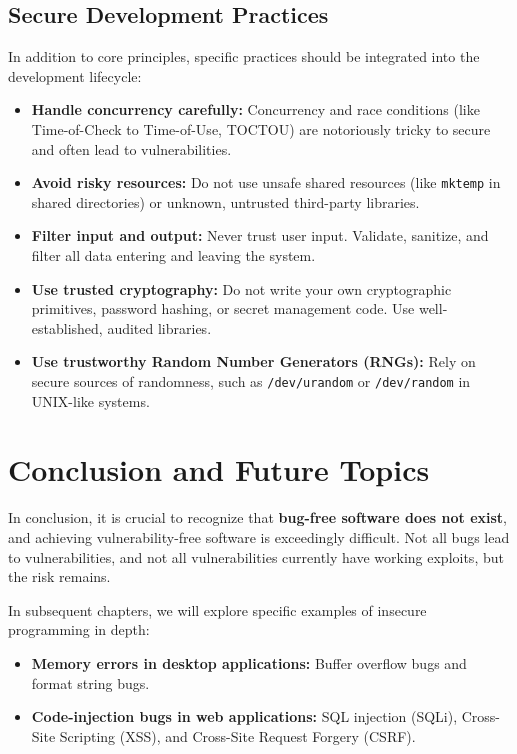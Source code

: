 \subsection{Secure Development Practices}
In addition to core principles, specific practices should be integrated into the development lifecycle:
\begin{itemize}
    \item \textbf{Handle concurrency carefully:} Concurrency and race conditions (like Time-of-Check to Time-of-Use, TOCTOU) are notoriously tricky to secure and often lead to vulnerabilities.
    \item \textbf{Avoid risky resources:} Do not use unsafe shared resources (like \texttt{mktemp} in shared directories) or unknown, untrusted third-party libraries.
    \item \textbf{Filter input and output:} Never trust user input. Validate, sanitize, and filter all data entering and leaving the system.
    \item \textbf{Use trusted cryptography:} Do not write your own cryptographic primitives, password hashing, or secret management code. Use well-established, audited libraries.
    \item \textbf{Use trustworthy Random Number Generators (RNGs):} Rely on secure sources of randomness, such as \texttt{/dev/urandom} or \texttt{/dev/random} in UNIX-like systems.
\end{itemize}

\section{Conclusion and Future Topics}
In conclusion, it is crucial to recognize that \textbf{bug-free software does not exist}, and achieving vulnerability-free software is exceedingly difficult. Not all bugs lead to vulnerabilities, and not all vulnerabilities currently have working exploits, but the risk remains.

In subsequent chapters, we will explore specific examples of insecure programming in depth:
\begin{itemize}
    \item \textbf{Memory errors in desktop applications:} Buffer overflow bugs and format string bugs.
    \item \textbf{Code-injection bugs in web applications:} SQL injection (SQLi), Cross-Site Scripting (XSS), and Cross-Site Request Forgery (CSRF).
\end{itemize}

